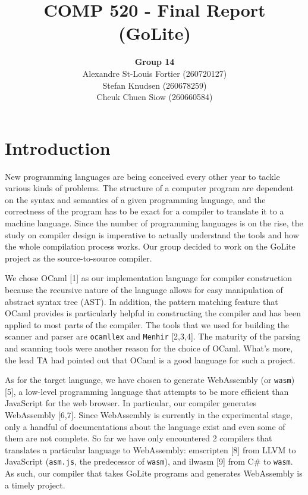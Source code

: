 \documentclass{article}
\begin{document}
\title{COMP 520 - Final Report (GoLite)}
\author{
\textbf{Group 14}\\
Alexandre St-Louis Fortier (260720127)\\
Stefan Knudsen (260678259)\\
Cheuk Chuen Siow (260660584)}
\maketitle

\raggedright
\section{Introduction}
New programming languages are being conceived every other year to tackle various kinds of problems. The structure of a computer program are dependent on the syntax and semantics of a given programming language, and the correctness of the program has to be exact for a compiler to translate it to a machine language. Since the number of programming languages is on the rise, the study on compiler design is imperative to actually understand the tools and how the whole compilation process works. Our group decided to work on the GoLite project as the source-to-source compiler.

We chose OCaml [1] as our implementation language for compiler construction because the recursive nature of the language allows for easy manipulation of abstract syntax tree (AST). In addition, the pattern matching feature that OCaml provides is particularly helpful in constructing the compiler and has been applied to most parts of the compiler. The tools that we used for building the scanner and parser are \verb|ocamllex| and \verb|Menhir| [2,3,4]. The maturity of the parsing and scanning tools were another reason for the choice of OCaml. What's more, the lead TA had pointed out that OCaml is a good language for such a project.

As for the target language, we have chosen to generate WebAssembly (or \verb|wasm|) [5], a low-level programming language that attempts to be more efficient than JavaScript for the web browser. In particular, our compiler generates WebAssembly [6,7]. Since WebAssembly is currently in the experimental stage, only a handful of documentations about the language exist and even some of them are not complete. So far we have only encountered 2 compilers that translates a particular language to WebAssembly: emscripten [8] from LLVM to JavaScript (\verb|asm.js|, the predecessor of \verb|wasm|), and ilwasm [9] from C\# to \verb|wasm|. As such, our compiler that takes GoLite programs and generates WebAssembly is a timely project.
\end{document}
